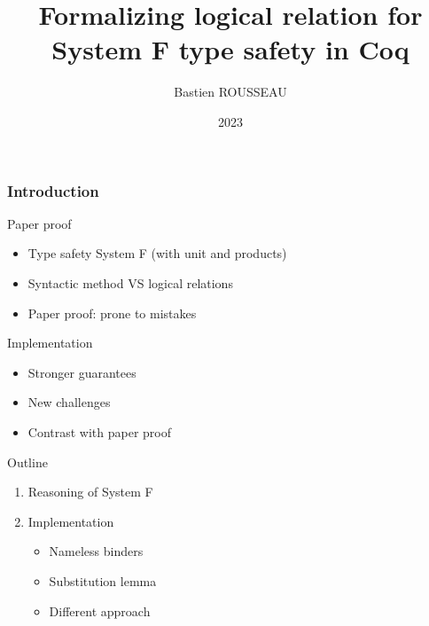 \documentclass[xcolor={usenames,dvipsnames}]{beamer}
\title{Formalizing logical relation for System F type safety in Coq}
\author{Bastien ROUSSEAU}
\date{2023}
\newcommand\xxsectiontitle[1]{\begin{center}\Huge{#1}\end{center}}
\renewcommand\section[1]{\begin{frame}[noframenumbering]{}\xxsectiontitle{#1}\end{frame}}
\begin{document}
\frame{\titlepage}

\begin{frame}
  \frametitle{Introduction}


  \begin{block}{Paper proof}
    \begin{itemize}
      \item Type safety System F (with unit and products)
      \item Syntactic method VS logical relations
      \item Paper proof: prone to mistakes
    \end{itemize}
  \end{block}

  \begin{block}{Implementation}
    \begin{itemize}
      \item Stronger guarantees
      \item New challenges
      \item Contrast with paper proof
    \end{itemize}
  \end{block}

\end{frame}

\begin{frame}{Outline}
  \begin{enumerate}
    \item Reasoning of System F
    \item Implementation
          \begin{itemize}
            \item Nameless binders
            \item Substitution lemma
            \item Different approach
          \end{itemize}
  \end{enumerate}
\end{frame}

\end{document}
